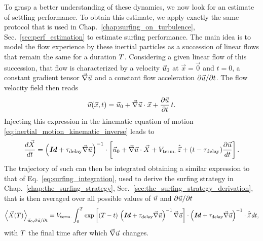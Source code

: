 To grasp a better understanding of these dynamics, we now look for an estimate of settling performance.
To obtain this estimate, we apply exactly the same protocol that is used in Chap.~\ref{chap:surfing_on_turbulence}, Sec.~\ref{sec:perf_estimation} to estimate surfing performance.
The main idea is to model the flow experience by these inertial particles as a succession of linear flows that remain the same for a duration $T$.
Considering a given linear flow of this succession, that flow is characterized by a velocity $\vec{u}_0$ at $\vec{x} = \vec{0}$ and $t = 0$, a constant gradient tensor $\vec{\nabla} \vec{u}$ and a constant flow acceleration $\partial \vec{u} / \partial t$.
The flow velocity field then reads 
\begin{equation}
	\vec{u}(\vec{x}, t) = \vec{u}_0 + \vec{\nabla} \vec{u} \cdot \vec{x} + \frac{\partial \vec{u}}{\partial t} \, t.
\end{equation}
Injecting this expression in the kinematic equation of motion \eqref{eq:inertial_motion_kinematic_inverse} leads to
\begin{equation}
	 \frac{d \vec{X}}{dt} = \left( \boldsymbol{\mathit{Id}} + \tau_{\mathrm{delay}} \vec{\nabla} \vec{u} \right)^{-1} \cdot \left[ \vec{u}_0 + \vec{\nabla} \vec{u} \cdot \vec{X} + V_{\mathrm{term.}} \, \hat{\vec{z}} + (t - \tau_{\mathrm{delay}}) \frac{\partial \vec{u}}{dt} \right].
\end{equation}
The trajectory of such can then be integrated obtaining a similar expression to that of Eq.~\eqref{eq:surfing_integration}, used to derive the surfing strategy in Chap.~\ref{chap:the_surfing_strategy}, Sec.~\ref{sec:the_surfing_strategy_derivation}, that is then averaged over all possible values of $\vec{u}$ and $\partial \vec{u} / \partial t$
\begin{equation}
	\label{eq:displacement}
	\left\langle \vec{X}(T) \right\rangle_{\vec{u}_0, \partial \vec{u} / \partial t} = V_{\mathrm{term.}} \int_{0}^{T} \exp \left[ (T - t) \, \left( \boldsymbol{\mathit{Id}} + \tau_{\mathrm{delay}} \vec{\nabla} \vec{u} \right)^{-1} \vec{\nabla} \vec{u} \right] \cdot \left( \boldsymbol{\mathit{Id}} + \tau_{\mathrm{delay}} \vec{\nabla} \vec{u} \right)^{-1} \cdot \hat{\vec{z}} \, dt,
\end{equation}
with $T$ the final time after which $\vec{\nabla} \vec{u}$ changes.

